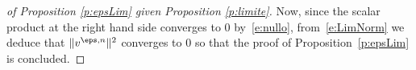 \documentclass[reqno,11pt]{preprint}
\newcommand{\vN}{v^{\eps,n}}
\newcommand{\bj}{\mathbf{j}}
\newcommand{\cL}{\mathcal{L}}
\newcommand{\dd}{\mathrm{d}}      %
\newcommand{\ST}{\mathscr{T}}
\newcommand{\1}{\mathds{1}}
\newcommand{\gensy}{\cL_0}
\begin{document}
\begin{proof}[of Proposition \ref{p:epsLim} given Proposition \ref{p:limite}]
Now, since the scalar product at the right hand side converges to $0$ by~\eqref{e:nullo}, from~\eqref{e:LimNorm} 
we deduce that $\|\vN\|^2$ converges to $0$ 
so that the proof of Proposition~\ref{p:epsLim} is concluded. 
\end{proof}
\end{document}
